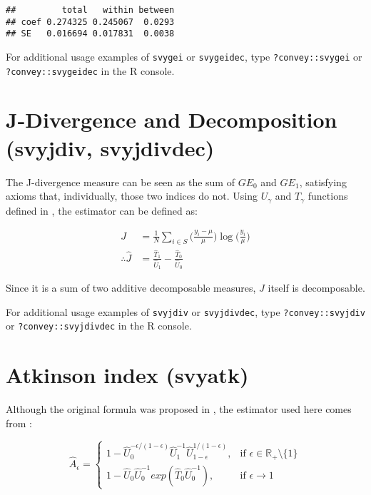 \documentclass[
]{book}
\begin{document}
\begin{verbatim}
##         total   within between
## coef 0.274325 0.245067  0.0293
## SE   0.016694 0.017831  0.0038
\end{verbatim}

For additional usage examples of \texttt{svygei} or \texttt{svygeidec}, type \texttt{?convey::svygei} or \texttt{?convey::svygeidec} in the R console.

\hypertarget{j-divergence-and-decomposition-svyjdiv-svyjdivdec}{%
\section{J-Divergence and Decomposition (svyjdiv, svyjdivdec)}\label{j-divergence-and-decomposition-svyjdiv-svyjdivdec}}

The J-divergence measure \autocite{rohde2016} can be seen as the sum of \(GE_0\) and \(GE_1\), satisfying axioms that, individually, those two indices do not. Using \(U_\gamma\) and \(T_\gamma\) functions defined in \textcite{biewen2003}, the estimator can be defined as:

\[
\begin{aligned}
J &= \frac{1}{N} \sum_{i \in S} \bigg( \frac{ y_i - \mu }{ \mu } \bigg) \log \bigg( \frac{y_i}{\mu} \bigg) \\
\therefore \widehat{J} &= \frac{\widehat{T}_1}{\widehat{U}_1} - \frac{ \widehat{T}_0 }{ \widehat{U}_0 }
\end{aligned}
\]

Since it is a sum of two additive decomposable measures, \(J\) itself is decomposable.

For additional usage examples of \texttt{svyjdiv} or \texttt{svyjdivdec}, type \texttt{?convey::svyjdiv} or \texttt{?convey::svyjdivdec} in the R console.

\hypertarget{atkinson-index-svyatk}{%
\section{Atkinson index (svyatk)}\label{atkinson-index-svyatk}}

Although the original formula was proposed in \textcite{atkinson1970}, the estimator used here comes from \textcite{biewen2003}:

\[
\widehat{A}_\epsilon =
\begin{cases}
 1 - \widehat{U}_0^{ - \epsilon/(1 - \epsilon) } \widehat{U}_1^{ -1 } \widehat{U}_{1 - \epsilon}^{ 1/(1 - \epsilon) } , &\text{if } \epsilon \in \mathbb{R}_+ \setminus\{ 1 \} \\
1 - \widehat{U}_0 \widehat{U}_0^{-1} exp( \widehat{T}_0 \widehat{U}_0^{-1} ), &\text{if } \epsilon \rightarrow1
\end{cases}
\]
\end{document}
